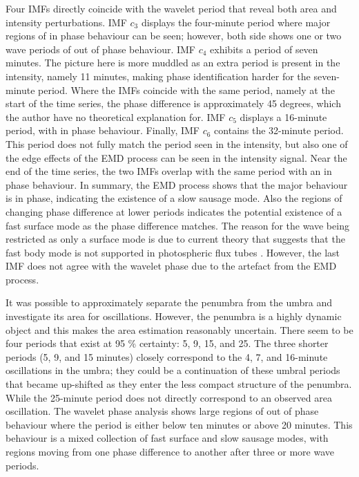 	Four IMFs directly coincide with the wavelet period that reveal both area and intensity perturbations.
	IMF $c_{3}$ displays the four-minute period where major regions of in phase behaviour can be seen; however, both side shows one or two wave periods of out of phase behaviour.
	IMF $c_{4}$ exhibits a period of seven minutes.
	The picture here is more muddled as an extra period is present in the intensity, namely 11 minutes, making phase identification harder for the seven-minute period.
	Where the IMFs coincide with the same period, namely at the start of the time series, the phase difference is approximately 45 degrees, which the author have no theoretical explanation for.
	IMF $c_{5}$ displays a 16-minute period, with in phase behaviour.
	Finally, IMF $c_{6}$ contains the 32-minute period.
	This period does not fully match the period seen in the intensity, but also one of the edge effects of the EMD process can be seen in the intensity signal.
	Near the end of the time series, the two IMFs overlap with the same period with an in phase behaviour.
	In summary, the EMD process shows that the major behaviour is in phase, indicating the existence of a slow sausage mode.
	Also the regions of changing phase difference at lower periods indicates the potential existence of a fast surface mode as the phase difference matches.
	The reason for the wave being restricted as only a surface mode is due to current theory that suggests that the fast body mode is not supported in photospheric flux tubes \citep{Moreels2013,Moreels2013b}. 
	However, the last IMF does not agree with the wavelet phase due to the artefact from the EMD process.
	
	It was possible to approximately separate the penumbra from the umbra and investigate its area for oscillations.
	However, the penumbra is a highly dynamic object and this makes the area estimation reasonably uncertain.
	There seem to be four periods that exist at 95 \% certainty: 5, 9, 15, and 25.
	The three shorter periods (5, 9, and 15 minutes) closely correspond to the 4, 7, and 16-minute oscillations in the umbra; they could be a continuation of these umbral periods that became up-shifted as they enter the less compact structure of the penumbra.
	While the 25-minute period does not directly correspond to an observed area oscillation.
	The wavelet phase analysis shows large regions of out of phase behaviour where the period is either below ten minutes or above 20 minutes.
	This behaviour is a mixed collection of fast surface and slow sausage modes, with regions moving from one phase difference to another after three or more wave periods.

